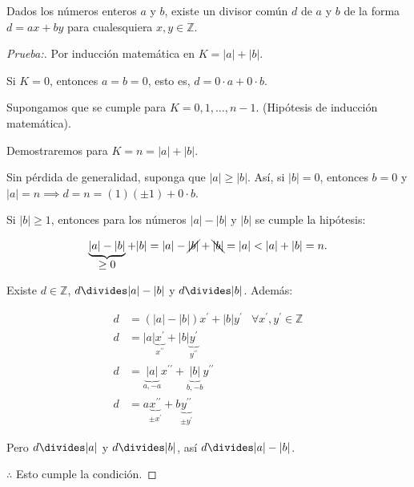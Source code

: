 \begin{theorem}\label{teo:1.1}

Dados los números enteros $a$ y $b$, existe un divisor común $d$ de $a$ y $b$ de la forma $d=ax+by$ para cualesquiera $x,y\in\mathbb{Z}$.

\begin{proof}[Prueba:]
Por inducción matemática en $K=|a|+|b|$.
 
Si $K=0$, entonces $a=b=0$, esto es, $d=0\cdot a+0\cdot b$. \checkmark
	 
\noindent
Supongamos que se cumple para $K=0,1,\ldots,n-1$. (Hipótesis de inducción matemática).
	 
Demostraremos para $\boxed{K=n=|a|+|b|}$.
	 
\noindent
Sin pérdida de generalidad, suponga que $|a|\geq|b|$. Así, si $|b|=0$, entonces $b=0$ y $|a|=n\implies d=n=(1)(\pm1)+0\cdot b$.
	 
Si $|b|\geq1$, entonces para los números $|a|-|b|$ y $|b|$ se cumple la hipótesis:

\[\underbrace{|a|-|b|}_{\displaystyle\geq0}+|b|=|a|-\cancel{|b|}+\bcancel{|b|}=|a|<|a|+|b|=n.\]

Existe $d\in\mathbb{Z}$, $d\divides |a|-|b|$ y $d\divides |b|$. Además:

\begin{align*}
	d&=\left(|a|-|b|\right)x^{\prime}+|b|y^{\prime}&\forall x^{\prime},y^{\prime}\in\mathbb{Z}\\
	d&=|a|\underbrace{x^{\prime}}_{\displaystyle x^{\prime\prime}}+|b|\underbrace{y^{\prime}}_{\displaystyle y^{\prime\prime}}&\\
	d&=\underbrace{|a|}_{a,-a}x^{\prime\prime}+\underbrace{|b|}_{b,-b}y^{\prime\prime}&\\
	d&=a\underbrace{x^{\prime\prime}}_{\pm x^{\prime}}+b\underbrace{y^{\prime\prime}}_{\pm y^{\prime}}&
\end{align*}

\noindent
Pero $d\divides |a|$ y $d\divides |b|$, así $d\divides |a|-|b|$.

\noindent
$\therefore$ Esto cumple la condición.
\end{proof}

\end{theorem}

